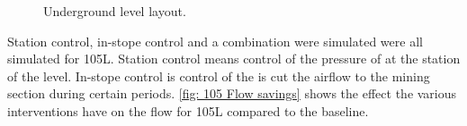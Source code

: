 	\begin{figure}[h!]
		\centering
		\caption{Underground level layout.}
		\label{fig: KUS Simulation level layout}
	\end{figure}	
	Station control, in-stope control and a combination were simulated were all simulated for 105L. Station control means control of the pressure of at the station of the level. In-stope control is control of the is cut the airflow to the mining section during certain periods. \cref{fig: 105 Flow savings} shows the effect the various interventions have on  the flow for 105L compared to the baseline.

